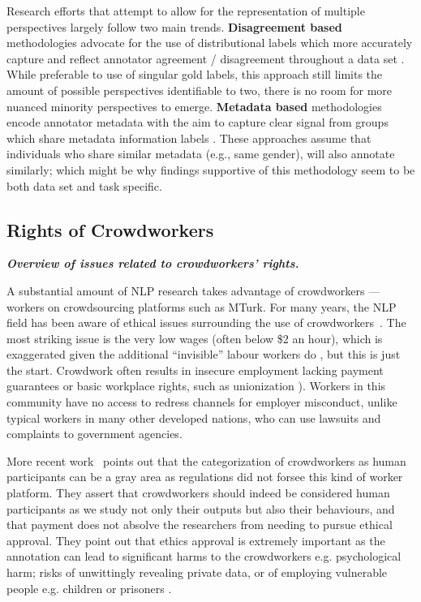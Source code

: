 Research efforts that attempt to allow for the representation of multiple perspectives largely follow two main trends. \textbf{Disagreement based} methodologies advocate for the use of distributional labels which more accurately capture and reflect annotator agreement / disagreement throughout a data set \citep{mokhberian-etal-2024-capturing,leonardelli-etal-2023-semeval,uma2022scaling,uma2021learning}. While preferable to use of singular gold labels, this approach still limits the amount of possible perspectives identifiable to two, there is no room for more nuanced minority perspectives to emerge. \textbf{Metadata based} methodologies encode annotator metadata with the aim to capture clear signal from groups which share metadata information labels \citep{rottger-etal-2022-two, davani-etal-2023-hate, fleisig-etal-2023-majority, 10.1145/3543507.3583290}. These approaches assume that individuals who share similar metadata (e.g., same gender), will also annotate similarly; which might be why findings supportive of this methodology seem to be both data set \citep{lee-etal-2023-large} and task \citep{welch-etal-2020-compositional} specific.

\subsection{Rights of Crowdworkers}\label{subsec:rights}\noindent\textbf{\textit{Overview of issues related to crowdworkers' rights.}}
\newline 

\noindent A substantial amount of NLP research takes
advantage of crowdworkers — workers on crowdsourcing platforms such as MTurk. 
For many years, the NLP field has been aware of ethical issues surrounding the use of 
crowdworkers~\cite{fort_last_2011, fort_crowdsourcing_2014, bederson_web_2011}. 
The most striking issue is the very low wages (often below \$2 an hour), which is exaggerated given the additional ``invisible'' labour workers do \citep{hara_data-driven_2018, toxtli_quantifying_2021}, but this is just the start. 
Crowdwork often results in insecure employment lacking payment guarantees or basic workplace rights, such as unionization \citep[cf][]{perrigo_150_2023}). Workers in this community have no access to redress channels for employer misconduct, unlike typical workers in many other developed nations, who can use lawsuits and complaints to government agencies.

More recent work~\citep{shmueli_beyond_2021} points out that the categorization of crowdworkers as human participants can be a gray area as regulations did not forsee this kind of worker platform. 
They assert that crowdworkers should indeed be considered human participants as we study not only their outputs but also their behaviours, and that payment does not absolve the researchers from needing to pursue ethical approval. They point out that ethics approval is extremely important as the annotation can lead to significant harms to the crowdworkers e.g. psychological harm; risks of unwittingly revealing private data, or of employing vulnerable people e.g. children or prisoners \citep{kaun_prison_2020, mason_conducting_2012}. 

